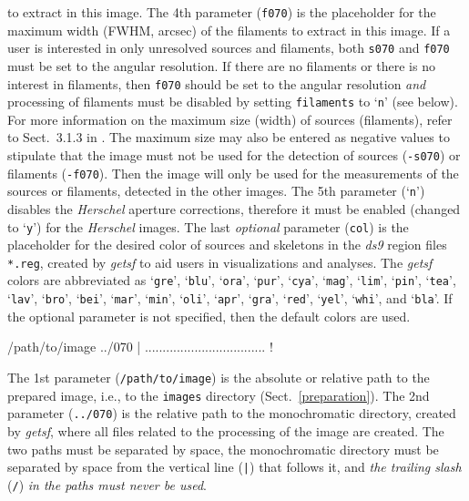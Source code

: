 \documentclass[a4paper,10pt]{article}
\begin{document}
to extract in this image. The 4th parameter (\verb!f070!) is the placeholder for the maximum width (FWHM, arcsec) of the filaments
to extract in this image. If a user is interested in only unresolved sources and filaments, both \verb!s070! and \verb!f070! must
be set to the angular resolution. If there are no filaments or there is no interest in filaments, then \verb!f070! should be set to
the angular resolution \emph{and} processing of filaments must be disabled by setting \verb!filaments! to `\verb!n!' (see below).
For more information on the maximum size (width) of sources (filaments), refer to Sect.~3.1.3 in \cite{Men'shchikov2021getsf}. The
maximum size may also be entered as negative values to stipulate that the image must not be used for the detection of sources
(\verb!-s070!) or filaments (\verb!-f070!). Then the image will only be used for the measurements of the sources or filaments,
detected in the other images. The 5th parameter (`\verb!n!') disables the \emph{Herschel} aperture corrections, therefore it must
be enabled (changed to `\verb!y!') for the \emph{Herschel} images. The last \emph{optional} parameter (\verb!col!) is the
placeholder for the desired color of sources and skeletons in the \textsl{ds9} region files \verb!*.reg!, created by \textsl{getsf}
to aid users in visualizations and analyses. The \textsl{getsf} colors are abbreviated as `\verb!gre!', `\verb!blu!', `\verb!ora!',
`\verb!pur!', `\verb!cya!', `\verb!mag!', `\verb!lim!', `\verb!pin!', `\verb!tea!', `\verb!lav!', `\verb!bro!', `\verb!bei!',
`\verb!mar!', `\verb!min!', `\verb!oli!', `\verb!apr!', `\verb!gra!', `\verb!red!', `\verb!yel!', `\verb!whi!', and `\verb!bla!'.
If the optional parameter is not specified, then the default colors are used.
\begin{verbnobox}[\mbox{}\small]
 /path/to/image ../070 | .................................. !
\end{verbnobox}
The 1st parameter (\verb!/path/to/image!) is the absolute or relative path to the prepared image, i.e., to the \verb!images!
directory (Sect.~\ref{preparation}). The 2nd parameter (\verb!../070!) is the relative path to the monochromatic directory, created
by \textsl{getsf}, where all files related to the processing of the image are created. The two paths must be separated by space,
the monochromatic directory must be separated by space from the vertical line (\verb!|!) that follows it, and \emph{the trailing
slash} (\verb!/!) \emph{in the paths must never be used}.
\end{document}
